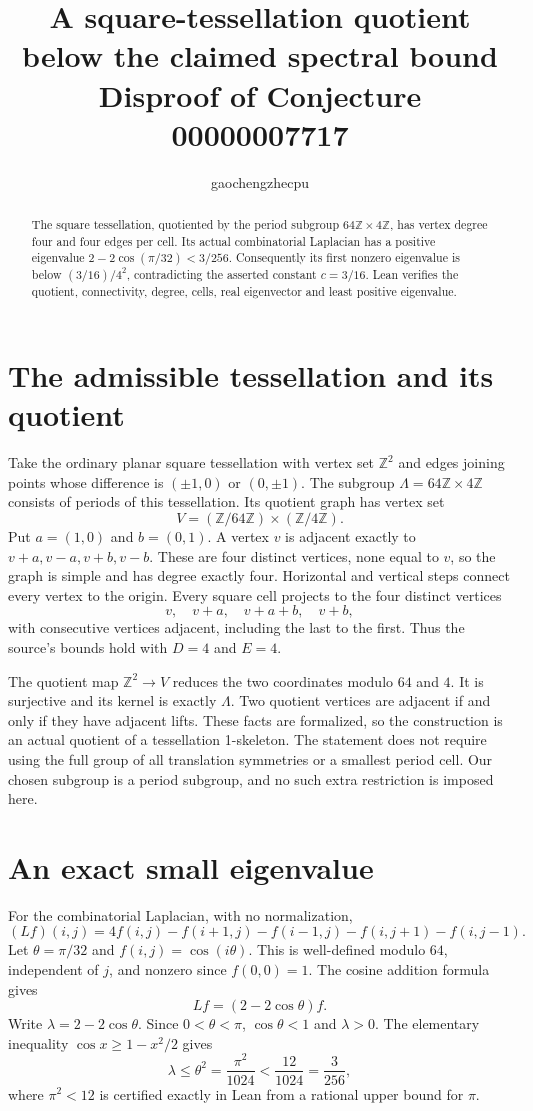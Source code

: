 \documentclass[11pt]{article}
\title{A square-tessellation quotient below the claimed spectral bound\\
\large Disproof of Conjecture 00000007717}
\author{gaochengzhecpu}\date{}
\begin{document}
\maketitle
\begin{abstract}
The square tessellation, quotiented by the period subgroup
$64\mathbb Z\times4\mathbb Z$, has vertex degree four and
four edges per cell. Its actual combinatorial Laplacian has
a positive eigenvalue $2-2\cos(\pi/32)<3/256$.
Consequently its first nonzero eigenvalue is below
$(3/16)/4^2$, contradicting the asserted constant $c=3/16$.
Lean verifies the quotient, connectivity, degree, cells,
real eigenvector and least positive eigenvalue.
\end{abstract}

\section*{The admissible tessellation and its quotient}
Take the ordinary planar square tessellation with vertex
set $\mathbb Z^2$ and edges joining points whose difference
is $(\pm1,0)$ or $(0,\pm1)$. The subgroup
$\Lambda=64\mathbb Z\times4\mathbb Z$ consists of periods
of this tessellation. Its quotient graph has vertex set
\[
 V=(\mathbb Z/64\mathbb Z)\times(\mathbb Z/4\mathbb Z).
\]
Put $a=(1,0)$ and $b=(0,1)$. A vertex $v$ is adjacent
exactly to $v+a,v-a,v+b,v-b$. These are four distinct
vertices, none equal to $v$, so the graph is simple and
has degree exactly four. Horizontal and vertical steps
connect every vertex to the origin. Every square cell
projects to the four distinct vertices
\[
 v,\quad v+a,\quad v+a+b,\quad v+b,
\]
with consecutive vertices adjacent, including the last to
the first. Thus the source's bounds hold with $D=4$ and
$E=4$.

The quotient map $\mathbb Z^2\to V$ reduces the two
coordinates modulo $64$ and $4$. It is surjective and its
kernel is exactly $\Lambda$. Two quotient vertices are
adjacent if and only if they have adjacent lifts. These
facts are formalized, so the construction is an actual
quotient of a tessellation 1-skeleton.
The statement does not require using the full group of
all translation symmetries or a smallest period cell.
Our chosen subgroup is a period subgroup, and no such
extra restriction is imposed here.

\newpage
\section*{An exact small eigenvalue}
For the combinatorial Laplacian, with no normalization,
\[
 (Lf)(i,j)=4f(i,j)-f(i+1,j)-f(i-1,j)
                   -f(i,j+1)-f(i,j-1).
\]
Let $\theta=\pi/32$ and $f(i,j)=\cos(i\theta)$.
This is well-defined modulo $64$, independent of $j$,
and nonzero since $f(0,0)=1$. The cosine addition formula
gives
\[
 Lf=(2-2\cos\theta)f.
\]
Write $\lambda=2-2\cos\theta$. Since $0<\theta<\pi$,
$\cos\theta<1$ and $\lambda>0$. The elementary inequality
$\cos x\geq1-x^2/2$ gives
\[
 \lambda\leq\theta^2=\frac{\pi^2}{1024}
        <\frac{12}{1024}=\frac3{256},
\]
where $\pi^2<12$ is certified exactly in Lean from a
rational upper bound for $\pi$.
\end{document}
